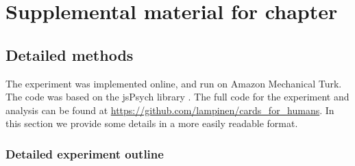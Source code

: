 \chapter{Supplemental material for chapter } \label{appendix:human}

\section{Detailed methods}
The experiment was implemented online, and run on Amazon Mechanical Turk. The code was based on the jsPsych library \citep{DeLeeuw2015}. The full code for the experiment and analysis can be found at \url{https://github.com/lampinen/cards_for_humans}. In this section we provide some details in a more easily readable format.

\subsection{Detailed experiment outline}

